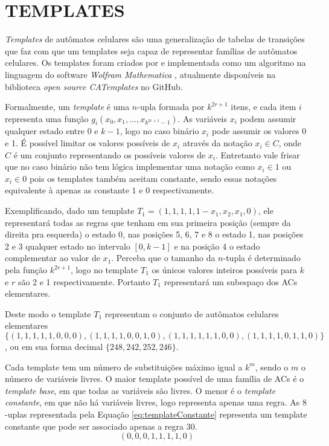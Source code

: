 \section{TEMPLATES}\label{sec:templates}
\textit{Templates} de autômatos celulares são uma generalização de tabelas de transições que faz com que um templates seja capaz de representar famílias de autômatos celulares. Os templates foram criados por  e implementada como um algoritmo na linguagem do software \textit{Wolfram Mathematica} \cite{woframMathematica10}, atualmente disponíveis na biblioteca \textit{open source CATemplates} \cite{CATemplates} no GitHub.

Formalmente, um \textit{template} é uma $n$-upla formada por $k^{2r+1}$ itens, e cada item $i$ representa uma função $g_i(x_0,x_1,\dots,x_{k^{2r+1}-1})$. As variáveis $x_i$ podem assumir qualquer estado entre 0 e $k-1$, logo no caso binário $x_i$ pode assumir os valores 0 e 1. É possível limitar os valores possíveis de $x_i$ através da notação $x_i \in C$, onde $C$ é um conjunto representando os possíveis valores de $x_i$. Entretanto vale frisar que no caso binário não tem lógica implementar uma notação como $x_i \in {1}$ ou $x_i \in {0}$ pois os templates também aceitam constante, sendo essas notações equivalente à apenas as constante $1$ e $0$ respectivamente.

Exemplificando, dado um template $T_1 = (1,1,1,1,1-x_1,x_2,x_1,0)$, ele representará todas as regras que tenham em sua primeira posição (sempre da direita pra esquerda) o estado 0, nas posições 5, 6, 7 e 8 o estado 1, nas posições 2 e 3 qualquer estado no intervalo $[0,k-1]$ e na posição 4 o estado complementar ao valor de $x_1$. Perceba que o tamanho da $n$-tupla é determinado pela função $k^{2r+1}$, logo no template $T_1$ os únicos valores inteiros possíveis para $k$ e $r$ são 2 e 1 respectivamente. Portanto $T_1$ representará um subespaço dos ACs elementares.

Deste modo o template $T_1$ representam o conjunto de autômatos celulares elementares $\{(1,1,1,1,1,0,0,0),(1,1,1,1,0,0,1,0),(1,1,1,1,1,1,0,0),(1,1,1,1,0,1,1,0)\}$, ou em sua forma decimal $\{248,242,252,246\}$.

Cada template tem um número de substituições máximo igual a $k^m$, sendo o $m$ o número de variáveis livres. O maior template possível de uma família de ACs é o \textit{template base}, em que todas as variáveis são livres. O menor é o \textit{template constante}, em que não há variáveis livres, logo representa apenas uma regra. As $8$-uplas representada pela Equação \ref{eq:templateConstante} representa um template constante que pode ser associado apenas a regra 30. 
\begin{equation}
(0,0,0,1,1,1,1,0)
\label{eq:templateConstante}
\end{equation}

